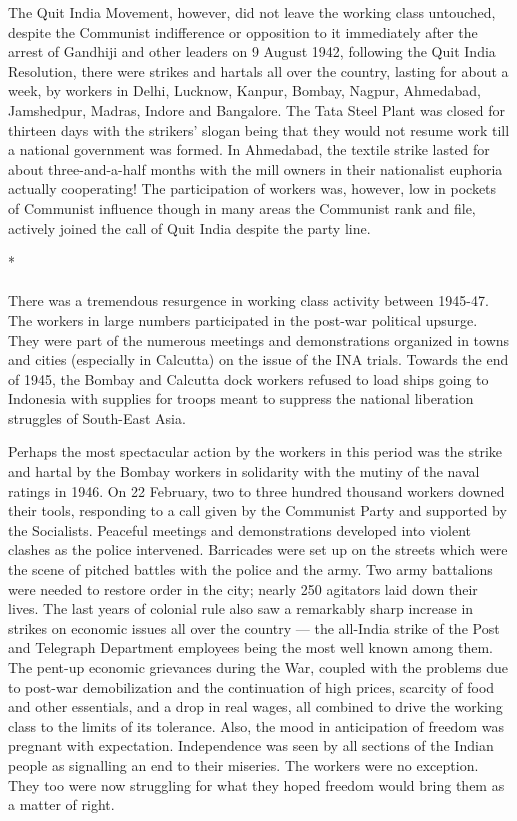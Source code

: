 The Quit India Movement, however, did not leave the working class untouched, despite the Communist indifference or opposition to it immediately after the arrest of Gandhiji and other leaders on 9 August 1942, following the Quit India Resolution, there were strikes and hartals all over the country, lasting for about a week, by workers in Delhi, Lucknow, Kanpur, Bombay, Nagpur, Ahmedabad, Jamshedpur, Madras, Indore and Bangalore. The Tata Steel Plant was closed for thirteen days with the strikers' slogan being that they would not resume work till a national government was formed. In Ahmedabad, the textile strike lasted for about three-and-a-half months with the mill owners in their nationalist euphoria actually cooperating! The participation of workers was, however, low in pockets of Communist influence though in many areas the Communist rank and file, actively joined the call of Quit India despite the party line.

\begin{center}*\end{center}

\paragraph*{}


There was a tremendous resurgence in working class activity between 1945-47. The workers in large numbers participated in the post-war political upsurge. They were part of the numerous meetings and demonstrations organized in towns and cities (especially in Calcutta) on the issue of the INA trials. Towards the end of 1945, the Bombay and Calcutta dock workers refused to load ships going to Indonesia with supplies for troops meant to suppress the national liberation struggles of South-East Asia.

Perhaps the most spectacular action by the workers in this period was the strike and hartal by the Bombay workers in solidarity with the mutiny of the naval ratings in 1946. On 22 February, two to three hundred thousand workers downed their tools, responding to a call given by the Communist Party and supported by the Socialists. Peaceful meetings and demonstrations developed into violent clashes as the police intervened. Barricades were set up on the streets which were the scene of pitched battles with the police and the army. Two army battalions were needed to restore order in the city; nearly 250 agitators laid down their lives. The last years of colonial rule also saw a remarkably sharp increase in strikes on economic issues all over the country — the all-India strike of the Post and Telegraph Department employees being the most well known among them. The pent-up economic grievances during the War, coupled with the problems due to post-war demobilization and the continuation of high prices, scarcity of food and other essentials, and a drop in real wages, all combined to drive the working class to the limits of its tolerance. Also, the mood in anticipation of freedom was pregnant with expectation. Independence was seen by all sections of the Indian people as signalling an end to their miseries. The workers were no exception. They too were now struggling for what they hoped freedom would bring them as a matter of right.
